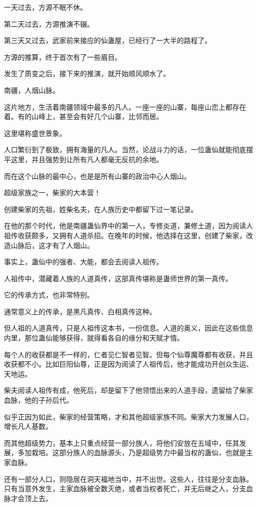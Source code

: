 \begin{this_body}
一天过去，方源不眠不休。

第二天过去，方源推演不辍。

第三天又过去，武家前来接应的仙蛊屋，已经行了一大半的路程了。

方源的推算，终于首次有了一些眉目。

发生了质变之后，接下来的推演，就开始顺风顺水了。

南疆，人烟山脉。

这片地方，生活着南疆领域中最多的凡人。一座一座的山寨，每座山峦上都存在着。有的山峰上，甚至会有好几个山寨，比邻而居。

这里堪称盛世景象。

人口繁衍到了极致，拥有海量的凡人。当然，论战斗力的话，一位蛊仙就能彻底摆平这里，并且强势到让所有凡人都毫无反抗的余地。

而在这个山脉的最中心，也是是所有山寨的政治中心人烟山。

超级家族之一，柴家的大本营！

创建柴家的先祖，姓柴名夫，在人族历史中都留下过一笔记录。

在他的那个时代，他是南疆蛊仙界中的第一人，专修炎道，兼修土道，因为阅读人祖传收获颇多，又拥有人道杀招。在晚年的时候，他选择在这里，创建了柴家，改造山脉后，这才有了人烟山。

事实上，蛊仙中的强者、大能，都会去阅读人祖传。

人祖传中，潜藏着人族的人道真传，这部真传堪称是蛊师世界的第一真传。

它的传承方式，也非常特别。

通常意义上的传承，是黑凡真传、白相真传这种。

但人祖的人道真传，只是人祖传这本书，一份信息。人道的奥义，因此在这些信息内里，那位蛊仙能够获得，就得看各自的缘分和天赋才情。

每个人的收获都是不一样的，仁者见仁智者见智。但每个仙尊魔尊都有收获，并且收获都不小。比如巨阳仙尊，正是因为阅读了人祖传后，他才能成功开创众生运、天地运。

柴夫阅读人祖传有成，他死后，却是留下了他领悟出来的人道手段，遗留给了柴家血脉，他的子孙后代。

似乎正因为如此，柴家的经营策略，才和其他超级家族不同。柴家大力发展人口，增长凡人基数。

而其他超级势力，基本上只重点经营一部分族人，将他们安放在五域中，任其发展，多加栽培。这部分族人的血脉源头，乃是超级势力中最当权的蛊仙，也就是主家血脉。

还有一部分人口，则隐居在洞天福地当中，并不出世。这些人，往往是分支血脉。只有当意外发生，主家血脉被全数灭绝，或者当权者死亡，并无后继之人，分支血脉才会顶上去。


\end{this_body}
